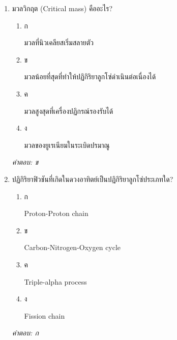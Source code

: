 \documentclass[12pt]{article}
\begin{document}
\begin{enumerate}[label=\arabic*., itemsep=0.5\baselineskip, topsep=0.5\baselineskip, leftmargin=*]
\item มวลวิกฤต (Critical mass) คืออะไร?
\begin{enumerate}[label=\alph*)., itemsep=0.3\baselineskip, topsep=0.3\baselineskip]
\item ก\ 
\begin{minipage}[t]{0.9\linewidth}
\raggedright มวลที่นิวเคลียสเริ่มสลายตัว
\end{minipage}
\item ข\ 
\begin{minipage}[t]{0.9\linewidth}
\raggedright มวลน้อยที่สุดที่ทำให้ปฏิกิริยาลูกโซ่ดำเนินต่อเนื่องได้
\end{minipage}
\item ค\ 
\begin{minipage}[t]{0.9\linewidth}
\raggedright มวลสูงสุดที่เครื่องปฏิกรณ์รองรับได้
\end{minipage}
\item ง\ 
\begin{minipage}[t]{0.9\linewidth}
\raggedright มวลของยูเรเนียมในระเบิดปรมาณู
\end{minipage}
\end{enumerate}
\vspace{-0.3\baselineskip}
\begin{small}
\textit{คำตอบ: ข}
\end{small}

\item ปฏิกิริยาฟิวชันที่เกิดในดวงอาทิตย์เป็นปฏิกิริยาลูกโซ่ประเภทใด?
\begin{enumerate}[label=\alph*)., itemsep=0.3\baselineskip, topsep=0.3\baselineskip]
\item ก\ 
\begin{minipage}[t]{0.9\linewidth}
\raggedright Proton-Proton chain
\end{minipage}
\item ข\ 
\begin{minipage}[t]{0.9\linewidth}
\raggedright Carbon-Nitrogen-Oxygen cycle
\end{minipage}
\item ค\ 
\begin{minipage}[t]{0.9\linewidth}
\raggedright Triple-alpha process
\end{minipage}
\item ง\ 
\begin{minipage}[t]{0.9\linewidth}
\raggedright Fission chain
\end{minipage}
\end{enumerate}
\vspace{-0.3\baselineskip}
\begin{small}
\textit{คำตอบ: ก}
\end{small}


\end{enumerate}
\end{document}
